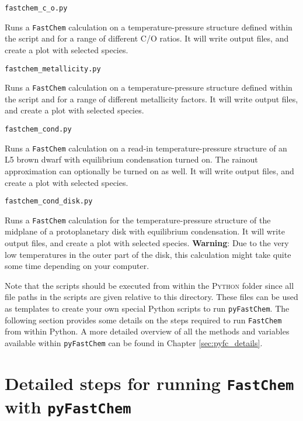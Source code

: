\documentclass[numbers=noenddot]{aux/fcmanual}
\newcommand{\fc}{\texttt{FastChem}\xspace}
\newcommand{\pfc}{\texttt{pyFastChem}\xspace}
\begin{document}
\lstinline!fastchem_c_o.py!
\begin{addmargin}[25pt]{0pt}
  Runs a \fc calculation on a temperature-pressure structure defined within the script and for a range of different C/O ratios. It will write output files, and create a plot with selected species.\\
\end{addmargin}

\lstinline!fastchem_metallicity.py!
\begin{addmargin}[25pt]{0pt}
  Runs a \fc calculation on a temperature-pressure structure defined within the script and for a range of different metallicity factors. It will write output files, and create a plot with selected species.\\
\end{addmargin}

\lstinline!fastchem_cond.py!
\begin{addmargin}[25pt]{0pt}
	Runs a \fc calculation on a read-in temperature-pressure structure of an L5 brown dwarf with equilibrium condensation turned on. The rainout approximation can optionally be turned on as well. It will write output files, and create a plot with selected species.\\
\end{addmargin}

\lstinline!fastchem_cond_disk.py!
\begin{addmargin}[25pt]{0pt}
	Runs a \fc calculation for the temperature-pressure structure of the midplane of a protoplanetary disk with equilibrium condensation. It will write output files, and create a plot with selected species. \textbf{Warning}: Due to the very low temperatures in the outer part of the disk, this calculation might take quite some time depending on your computer.\\
\end{addmargin}

Note that the scripts should be executed from within the \textsc{Python} folder since all file paths in the scripts are given relative to this directory.
These files can be used as templates to create your own special Python scripts to run \pfc. The following section provides some details on the steps required to run \fc from within Python. A more detailed overview of all the methods and variables available within \pfc can be found in Chapter \ref{sec:pyfc_details}.


\section{Detailed steps for running \fc with \pfc}
\end{document}
